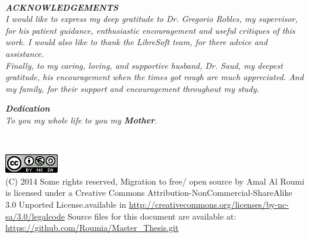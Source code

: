 \documentclass[a4paper, 12pt]{book}
\begin{document}
\newpage
~
\thispagestyle{empty}
\vspace{3cm}
\begin{flushright}
\textbf{\textit{ACKNOWLEDGEMENTS}} \\
\textit{I would like to express my deep gratitude to Dr. Gregorio Robles, my
  supervisor, for his patient guidance, enthusiastic encouragement and
  useful critiques of this work.
I would also like to thank the LibreSoft team,  for there advice and assistance. \\
Finally, to my caring, loving, and supportive husband, Dr. Saud,  my
deepest gratitude, his encouragement when the times got rough are much appreciated. And my family,  for their support and encouragement throughout my study.
 }
 
 \vspace{2cm}
\textbf{\textit{Dedication}} \\
\textit{To you my whole life to you my   \textbf{Mother}.}
\end{flushright}
\newpage
\thispagestyle{empty}
~
\newpage
~
\thispagestyle{empty}
\vspace{16cm}
\begin{flushright}
\includegraphics[scale=1.2]{img/cc-by-ns.png} \\

(C) 2014 Some rights reserved, Migration to free/ open source by Amal Al Roumi is licensed under a Creative Commons Attribution-NonCommercial-ShareAlike 3.0 Unported  License.available in
 \url {http://creativecommons.org/licenses/by-nc-sa/3.0/legalcode}
Source files for this document are available at: \url{https://github.com/Roumia/Master_Thesis.git}

\end{flushright}
\newpage
~
\thispagestyle{empty}
\tableofcontents  
\listoffigures  

\end{document}
